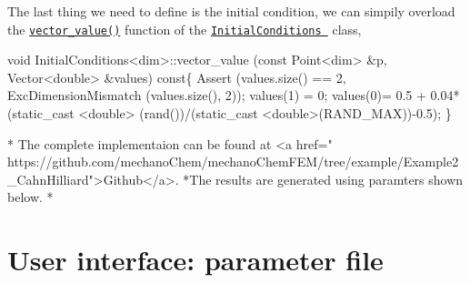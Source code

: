 The last thing we need to define is the initial condition, we can simpily overload the \href{../html/class_initial_conditions.html#aa10cfdd7350c3810a8deab707f397657}{\tt vector\-\_\-value()} function of the \href{../html/class_initial_conditions.html}{\tt Initial\-Conditions } class, 
\begin{DoxyCode}
\textcolor{keywordtype}{void} InitialConditions<dim>::vector_value (\textcolor{keyword}{const} Point<dim>   &p, Vector<double>   &values)\textcolor{keyword}{ const}\{
  Assert (values.size() == 2, ExcDimensionMismatch (values.size(), 2));
  values(1) = 0;    
 values(0)= 0.5 + 0.04*(static\_cast <\textcolor{keywordtype}{double}> (rand())/(static\_cast <double>(RAND\_MAX))-0.5);
\}

* The complete implementaion can be found at  <a href=\textcolor{stringliteral}{"
      https://github.com/mechanoChem/mechanoChemFEM/tree/example/Example2\_CahnHilliard"}>Github</a>. 
*The results are generated \textcolor{keyword}{using} paramters shown below.
* 
\end{DoxyCode}
\hypertarget{growth_file}{}\section{User interface\-: parameter file}\label{growth_file}

